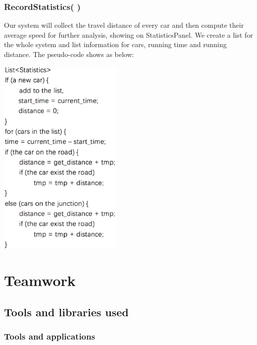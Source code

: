 \documentclass[a4paper,12pt]{article}
\begin{document}
\subsubsection{RecordStatistics( )}
Our system will collect the travel distance of every car and then compute their average speed for further analysis, showing on StatisticsPanel. We create a list for the whole system and list information for cars, running time and running distance. The pseudo-code shows as below:
\begin{center}
	\includegraphics[width=6cm] {GUI_p2.eps}
\end{center}

\section{Teamwork}

\subsection{Tools and libraries used}

\subsubsection*{Tools and applications}
\end{document}
